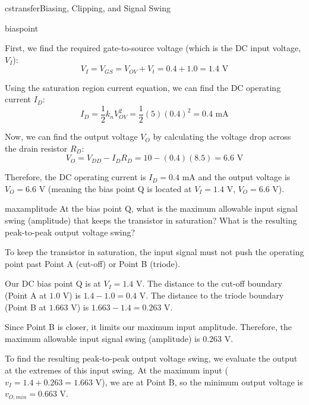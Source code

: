 \begin{mainquestion}{cstransfer}{Biasing, Clipping, and Signal Swing}
\begin{partquestion}{biaspoint}
\begin{answer}
        First, we find the required gate-to-source voltage (which is the DC input voltage, $V_I$):
        \[V_I = V_{GS} = V_{OV} + V_t = 0.4 + 1.0 = 1.4 \text{ V}\]
        
        Using the saturation region current equation, we can find the DC operating current $I_D$:
        \[I_D = \frac{1}{2}k_n V_{OV}^2 = \frac{1}{2}(5)(0.4)^2 = 0.4 \text{ mA}\]
        
        Now, we can find the output voltage $V_O$ by calculating the voltage drop across the drain resistor $R_D$:
        \[V_O = V_{DD} - I_D R_D = 10 - (0.4)(8.5) = 6.6 \text{ V}\]
        
        Therefore, the DC operating current is $I_D = 0.4 \text{ mA}$ and the output voltage is $V_O = 6.6 \text{ V}$ (meaning the bias point Q is located at $V_I = 1.4 \text{ V}$, $V_O = 6.6 \text{ V}$).
\end{answer}

\pagebreak
\end{partquestion}

\begin{partquestion}{maxamplitude}
{At the bias point Q, what is the maximum allowable input signal swing (amplitude) that keeps the transistor in saturation? What is the resulting peak-to-peak output voltage swing?}

\begin{answer}
        To keep the transistor in saturation, the input signal must not push the operating point past Point A (cut-off) or Point B (triode).
        
        Our DC bias point Q is at $V_I = 1.4 \text{ V}$.
        The distance to the cut-off boundary (Point A at $1.0 \text{ V}$) is $1.4 - 1.0 = 0.4 \text{ V}$.
        The distance to the triode boundary (Point B at $1.663 \text{ V}$) is $1.663 - 1.4 = 0.263 \text{ V}$.
        
        Since Point B is closer, it limits our maximum input amplitude. Therefore, the maximum allowable input signal swing (amplitude) is $0.263 \text{ V}$.
        
        To find the resulting peak-to-peak output voltage swing, we evaluate the output at the extremes of this input swing.
        At the maximum input ($v_I = 1.4 + 0.263 = 1.663 \text{ V}$), we are at Point B, so the minimum output voltage is $v_{O,min} = 0.663 \text{ V}$.
        

\end{answer}
\end{partquestion}
\end{mainquestion}
